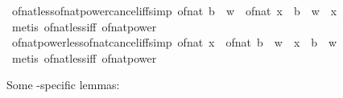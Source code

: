 \begin{isabellebody}
\endisatagproof
{\isafoldproof}%
%
\isadelimproof
\isanewline
%
\endisadelimproof
\isanewline
{}\isamarkupfalse%
\ of{\isacharunderscore}{\kern0pt}nat{\isacharunderscore}{\kern0pt}less{\isacharunderscore}{\kern0pt}of{\isacharunderscore}{\kern0pt}nat{\isacharunderscore}{\kern0pt}power{\isacharunderscore}{\kern0pt}cancel{\isacharunderscore}{\kern0pt}iff{\isacharbrackleft}{\kern0pt}simp{\isacharbrackright}{\kern0pt}{\isacharcolon}{\kern0pt}\ {\isachardoublequoteopen}{\isacharparenleft}{\kern0pt}of{\isacharunderscore}{\kern0pt}nat\ b{\isacharparenright}{\kern0pt}\ {\isacharcircum}{\kern0pt}\ w\ {\isacharless}{\kern0pt}\ of{\isacharunderscore}{\kern0pt}nat\ x\ {\isasymlongleftrightarrow}\ b\ {\isacharcircum}{\kern0pt}\ w\ {\isacharless}{\kern0pt}\ x{\isachardoublequoteclose}\isanewline
%
\isadelimproof
\ \ %
\endisadelimproof
%
\isatagproof
{}\isamarkupfalse%
\ {\isacharparenleft}{\kern0pt}metis\ of{\isacharunderscore}{\kern0pt}nat{\isacharunderscore}{\kern0pt}less{\isacharunderscore}{\kern0pt}iff\ of{\isacharunderscore}{\kern0pt}nat{\isacharunderscore}{\kern0pt}power{\isacharparenright}{\kern0pt}%
\endisatagproof
{\isafoldproof}%
%
\isadelimproof
\isanewline
%
\endisadelimproof
\isanewline
{}\isamarkupfalse%
\ of{\isacharunderscore}{\kern0pt}nat{\isacharunderscore}{\kern0pt}power{\isacharunderscore}{\kern0pt}less{\isacharunderscore}{\kern0pt}of{\isacharunderscore}{\kern0pt}nat{\isacharunderscore}{\kern0pt}cancel{\isacharunderscore}{\kern0pt}iff{\isacharbrackleft}{\kern0pt}simp{\isacharbrackright}{\kern0pt}{\isacharcolon}{\kern0pt}\ {\isachardoublequoteopen}of{\isacharunderscore}{\kern0pt}nat\ x\ {\isacharless}{\kern0pt}\ {\isacharparenleft}{\kern0pt}of{\isacharunderscore}{\kern0pt}nat\ b{\isacharparenright}{\kern0pt}\ {\isacharcircum}{\kern0pt}\ w\ {\isasymlongleftrightarrow}\ x\ {\isacharless}{\kern0pt}\ b\ {\isacharcircum}{\kern0pt}\ w{\isachardoublequoteclose}\isanewline
%
\isadelimproof
\ \ %
\endisadelimproof
%
\isatagproof
{}\isamarkupfalse%
\ {\isacharparenleft}{\kern0pt}metis\ of{\isacharunderscore}{\kern0pt}nat{\isacharunderscore}{\kern0pt}less{\isacharunderscore}{\kern0pt}iff\ of{\isacharunderscore}{\kern0pt}nat{\isacharunderscore}{\kern0pt}power{\isacharparenright}{\kern0pt}%
\endisatagproof
{\isafoldproof}%
%
\isadelimproof
\isanewline
%
\endisadelimproof
\isanewline
{}\isamarkupfalse%
%
\begin{isamarkuptext}%
Some -specific lemmas:%
\end{isamarkuptext}\isamarkuptrue%
\isamarkupfalse%

\end{isabellebody}
